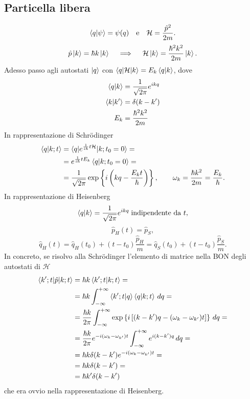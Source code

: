 \subsection{Particella libera}
\[
\braket{q|\psi} = \psi(q) \quad \text{e} \quad \mathcal{H} = \frac{\hat{p}^2}{2m}.
\]
\[
\hat{p}\ket{k} = \hbar k \ket{k} \quad \implies \quad \mathcal{H} \ket{k} = \frac{\hbar^2 k^2}{2m} \ket{k}.
\]
Adesso passo agli autostati \( \ket{q} \) con \( \braket{q|\mathcal{H}|k} = E_k \braket{q|k} \), dove
\begin{align*}
\braket{q|k} &= \frac{1}{\sqrt{2\pi}} e^{ikq} \\
\braket{k|k'} &= \delta(k - k') \\
E_k &= \frac{\hbar^2 k^2}{2m}
\end{align*}
In rappresentazione di Schr\"odinger
\begin{align*}
\braket{q|k; t} &= \braket{q|e^{\frac{1}{i \hbar}t \mathcal{H}}|k; t_0 = 0} = \\
&= e^{\frac{1}{i \hbar}t E_k} \braket{q|k; t_0 = 0} = \\
&= \frac{1}{\sqrt{2\pi}} \exp \left\{ i \left( kq - \frac{E_k t}{\hbar} \right) \right\}, \qquad \omega_k = \frac{\hbar k^2}{2m} = \frac{E_k}{\hbar}.
\end{align*}
In rappresentazione di Heisenberg
\[
\braket{q|k} = \frac{1}{\sqrt{2\pi}} e^{ikq} \; \text{indipendente da } t,
\]
\[
\hat{p}_H(t) = \hat{p}_S,
\]
\[
\hat{q}_H(t) = \hat{q}_H(t_0) + (t - t_0) \frac{\hat{p}_H}{m} = \hat{q}_S(t_0) + (t - t_0) \frac{\hat{p}_S}{m}.
\]
In concreto, se risolvo alla Schr\"odinger l'elemento di matrice nella BON degli autostati di \( \mathcal{H} \)
\begin{align*}
\braket{k'; t|\hat{p}|k; t} &= \hbar k \braket{k'; t|k; t} = \\
&= \hbar k \int_{-\infty}^{+\infty} \braket{k'; t|q} \braket{q|k; t} \, dq = \\
&= \frac{\hbar k}{2\pi} \int_{-\infty}^{+\infty} \exp \left\{ i \left[ (k - k')q - (\omega_k - \omega_{k'})t \right] \right\} \, dq = \\
&= \frac{\hbar k}{2\pi} e^{-i(\omega_k - \omega_{k'})t} \int_{-\infty}^{+\infty} e^{i(k - k')q} \, dq = \\
&= \hbar k \delta(k - k') e^{-i(\omega_k - \omega_{k'})t} = \\
&= \hbar k \delta(k - k') = \\
&= \hbar k' \delta(k - k')
\end{align*}
che era ovvio nella rappresentazione di Heisenberg.
